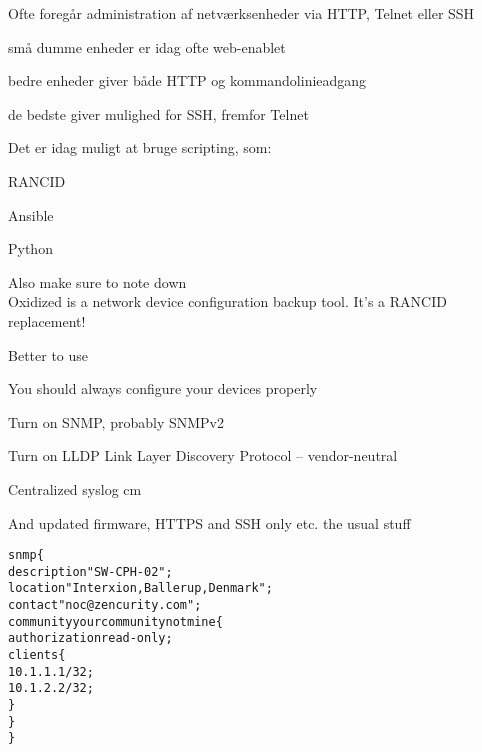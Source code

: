 \documentclass[Screen16to9,17pt]{foils}
\begin{document}
\begin{list1}
\item Ofte foregår administration af netværksenheder via HTTP, Telnet eller SSH
\begin{list2}
\item små dumme enheder er idag ofte web-enablet
\item bedre enheder giver både HTTP og kommandolinieadgang
\item de bedste giver mulighed for SSH, fremfor Telnet
\end{list2}
\item Det er idag muligt at bruge scripting, som:
\begin{list2}
\item RANCID 
\item Ansible 
\item Python
\item Also make sure to note down \\
Oxidized is a network device configuration backup tool. It's a RANCID replacement!
\end{list2}
\end{list1}





Better to use 




\begin{slidelist}
\item You should always configure your devices properly
\item Turn on SNMP, probably SNMPv2
\item Turn on LLDP Link Layer Discovery Protocol -- vendor-neutral\\
{\small{}}
\item Centralized syslog
 cm
\item And updated firmware, HTTPS and SSH only etc. the usual stuff
\end{slidelist}



\begin{alltt}
snmp \{
    description "SW-CPH-02";
    location "Interxion, Ballerup, Denmark";
    contact "noc@zencurity.com";
    community yourcommunitynotmine \{
        authorization read-only;
        clients \{
            10.1.1.1/32;
            10.1.2.2/32;
        \}
    \}
\}
\end{alltt}
\end{document}
